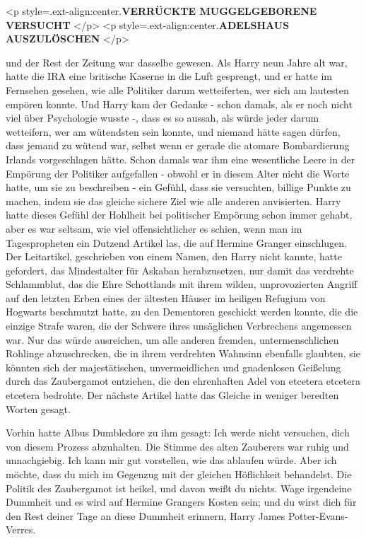 <p style=\grqq{}.ext-align:center\grqq{}.\textbf{\glqq VERRÜCKTE MUGGELGEBORENE
VERSUCHT }</p> <p style=\grqq{}.ext-align:center\grqq{}.\textbf{ADELSHAUS
AUSZULÖSCHEN\grqq{} }</p>

und der Rest der Zeitung war dasselbe gewesen. Als Harry neun Jahre alt war,
hatte die IRA eine britische Kaserne in die Luft gesprengt, und er hatte im
Fernsehen gesehen, wie alle Politiker darum wetteiferten, wer sich am lautesten
empören konnte. Und Harry kam der Gedanke - schon damals, als er noch nicht viel
über Psychologie wusste -, dass es so aussah, als würde jeder darum wetteifern,
wer am wütendsten sein konnte, und niemand hätte sagen dürfen, dass jemand zu
wütend war, selbst wenn er gerade die atomare Bombardierung Irlands
vorgeschlagen hätte. Schon damals war ihm eine wesentliche Leere in der Empörung
der Politiker aufgefallen - obwohl er in diesem Alter nicht die Worte hatte, um
sie zu beschreiben - ein Gefühl, dass sie versuchten, billige Punkte zu machen,
indem sie das gleiche sichere Ziel wie alle anderen anvisierten. Harry hatte
dieses Gefühl der Hohlheit bei politischer Empörung schon immer gehabt, aber es
war seltsam, wie viel offensichtlicher es schien, wenn man im Tagespropheten ein
Dutzend Artikel las, die auf Hermine Granger einschlugen. Der Leitartikel,
geschrieben von einem Namen, den Harry nicht kannte, hatte gefordert, das
Mindestalter für Askaban herabzusetzen, nur damit das verdrehte Schlammblut, das
die Ehre Schottlands mit ihrem wilden, unprovozierten Angriff auf den letzten
Erben eines der ältesten Häuser im heiligen Refugium von Hogwarts beschmutzt
hatte, zu den Dementoren geschickt werden konnte, die die einzige Strafe waren,
die der Schwere ihres unsäglichen Verbrechens angemessen war. Nur das würde
ausreichen, um alle anderen fremden, untermenschlichen Rohlinge abzuschrecken,
die in ihrem verdrehten Wahnsinn ebenfalls glaubten, sie könnten sich der
majestätischen, unvermeidlichen und gnadenlosen Geißelung durch das Zaubergamot
entziehen, die den ehrenhaften Adel von etcetera etcetera etcetera bedrohte. Der
nächste Artikel hatte das Gleiche in weniger beredten Worten gesagt.

Vorhin hatte Albus Dumbledore zu ihm gesagt: \glqq Ich werde nicht versuchen,
dich von diesem Prozess abzuhalten.\grqq{} Die Stimme des alten Zauberers war
ruhig und unnachgiebig. \glqq Ich kann mir gut vorstellen, wie das ablaufen
würde. Aber ich möchte, dass du mich im Gegenzug mit der gleichen Höflichkeit
behandelst. Die Politik des Zaubergamot ist heikel, und davon weißt du nichts.
Wage irgendeine Dummheit und es wird auf Hermine Grangers Kosten sein; und du
wirst dich für den Rest deiner Tage an diese Dummheit erinnern, Harry James
Potter-Evans-Verres.\grqq{}

